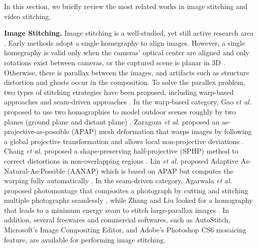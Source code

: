 \documentclass[conference]{IEEEtran}
\begin{document}
In this section, we briefly review the most related works in image stitching and video stitching.


{\bf Image Stitching.} Image stitching is a well-studied, yet still active research 
area \cite{paragios2006handbook, brown2007automatic,hartley2003multiple,lin2011smoothly, chang2014shape, zaragoza2013projective,lin2015adaptive,zhang2014parallax, gao2013seam, agarwala2004interactive,gao2011constructing}. 
Early methods adopt a single homegraphy to align images.
However, a single homegraphy is valid only when the cameras' optical center are aligned and only rotations exist between cameras, or the captured scene is planar in 3D \cite{hartley2003multiple}. 
Otherwise, there is parallax between the images, and artifacts such as structure distortion and ghosts occur in the composition. 
To solve the parallex problem, two types of stitching strategies have been proposed, including warp-based approaches \cite{lin2011smoothly, chang2014shape, zaragoza2013projective} and seam-driven approaches \cite{zhang2014parallax, gao2013seam, agarwala2004interactive}. 
In the warp-based category, 
Gao \textit{et al.} proposed to use two homographies to model outdoor scenes roughly by two planes (ground plane and distant plane) \cite{gao2011constructing}.
Zaragoza \textit{et al.} proposed an as-projective-as-possible (APAP) mesh deformation that warps
images by following a global projective transformation and allows local non-projective 
deviations \cite{zaragoza2013projective}.
Chang \textit{et al.} proposed a shape-preserving half-projective (SPHP) method
to correct distortions in non-overlapping regions \cite{chang2014shape}. 
Lin \textit{et al.} proposed Adaptive As-Natural-As-Possible (AANAP) 
which is based on APAP but computes the warping fully automatically \cite{lin2015adaptive}.
In the seam-driven category, Agarwala \textit{et al.}
proposed photomontage that composites a photograph by
cutting and stitching multiple photographs seamlessly \cite{agarwala2004interactive},
while Zhang and Liu looked for a homography that leads to a
minimum energy seam to stitch large-parallax images \cite{zhang2014parallax}.
In addition, several freewares and commercial softwares, such as AutoStitch, Microsoft’s Image Compositing Editor, and Adobe's Photoshop CS6 mosaicing feature, are available for performing image stitching.
\end{document}

